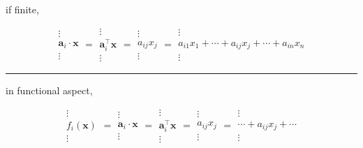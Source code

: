 \documentclass[
]{book}
\theoremstyle{definition}
\theoremstyle{definition}
\theoremstyle{definition}
\theoremstyle{definition}
\theoremstyle{remark}
\begin{document}
if finite,

\[
\begin{array}{c}
\vdots\\
\boldsymbol{a}_{{\scriptscriptstyle i}}\cdot\boldsymbol{x}\\
\vdots
\end{array}=\begin{array}{c}
\vdots\\
\boldsymbol{a}_{{\scriptscriptstyle i}}^{\intercal}\boldsymbol{x}\\
\vdots
\end{array}=\begin{array}{c}
\vdots\\
a_{{\scriptscriptstyle ij}}x_{{\scriptscriptstyle j}}\\
\vdots
\end{array}=\begin{array}{c}
\vdots\\
a_{{\scriptscriptstyle i1}}x_{{\scriptscriptstyle 1}}+\cdots+a_{{\scriptscriptstyle ij}}x_{{\scriptscriptstyle j}}+\cdots+a_{{\scriptscriptstyle in}}x_{{\scriptscriptstyle n}}\\
\vdots
\end{array}
\]

\begin{center}\rule{0.5\linewidth}{0.5pt}\end{center}

in functional aspect,

\[
\begin{array}{c}
\vdots\\
f_{{\scriptscriptstyle i}}\left(\boldsymbol{x}\right)\\
\vdots
\end{array}=\begin{array}{c}
\vdots\\
\boldsymbol{a}_{{\scriptscriptstyle i}}\cdot\boldsymbol{x}\\
\vdots
\end{array}=\begin{array}{c}
\vdots\\
\boldsymbol{a}_{{\scriptscriptstyle i}}^{\intercal}\boldsymbol{x}\\
\vdots
\end{array}=\begin{array}{c}
\vdots\\
a_{{\scriptscriptstyle ij}}x_{{\scriptscriptstyle j}}\\
\vdots
\end{array}=\begin{array}{c}
\vdots\\
\cdots+a_{{\scriptscriptstyle ij}}x_{{\scriptscriptstyle j}}+\cdots\\
\vdots
\end{array}
\]
\end{document}
